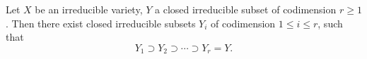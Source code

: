Let $X$ be an irreducible variety, $Y$ a closed irreducible subset of codimension $r \geqslant 1$. Then there exist closed irreducible subsets $Y_i$ of codimension $1 \leqslant i \leqslant r$, such that
$$Y_1 \supset Y_2 \supset \cdots \supset Y_r = Y.$$

